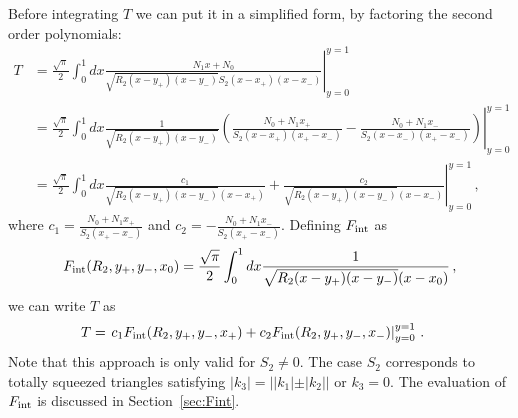 \documentclass[twoside]{article}
\begin{document}
Before integrating $T$ we can put it in a simplified form, by factoring the second order polynomials:
\begin{align}
  T &=  \frac{\sqrt{\pi}}{2}\int_0^1 dx \left. \frac{N_1 x + N_0}{\sqrt{R_2(x - y_+)(x - y_-)}S_2(x - x_+)(x - x_-)} \right|^{y = 1}_{y = 0}\\
&= \frac{\sqrt{\pi}}{2}\int_0^1 dx \left. \frac{1}{\sqrt{R_2(x - y_+)(x - y_-)}}\left(\frac{N_0+N_1 x_+}{S_2(x - x_+)(x_+ - x_-)} - \frac{N_0+N_1 x_-}{S_2(x - x_-)(x_+ - x_-)}\right) \right|^{y = 1}_{y = 0} \\
&= \frac{\sqrt{\pi}}{2}\int_0^1 dx \left. \frac{c_1}{\sqrt{R_2(x - y_+)(x - y_-)}(x-x_+)}+\frac{c_2}{\sqrt{R_2(x - y_+)(x - y_-)}(x-x_-)} \right|^{y = 1}_{y = 0} \,, 
\end{align}
where $c_1 = \frac{N_0+N_1 x_+}{S_2(x_+ - x_-)}$ and $c_2 = - \frac{N_0+N_1 x_-}{S_2(x_+ - x_-)}$. Defining $F_{\rm int}$ as 
\begin{equation}
F_{\rm int}(R_2, y_+, y_-, x_0) = \frac{\sqrt{\pi}}{2}\int_0^1 dx \frac{1}{\sqrt{R_2(x - y_+)(x - y_-)}(x-x_0)}\,,
\end{equation}
we can write $T$ as 
\begin{align}  
T &= \left.c_1 F_{\rm int}(R_2, y_+, y_-, x_+) + c_2 F_{\rm int}(R_2, y_+, y_-, x_-)\right|^{y = 1}_{y = 0}\,.
\end{align}
Note that this approach is only valid for $S_2 \neq 0$. The case $S_2$ corresponds to totally squeezed triangles satisfying $|k_3| = ||k_1| \pm |k_2||$ or $k_3 = 0$.
The evaluation of $F_{\rm int}$ is discussed in Section~\ref{sec:Fint}.
\end{document}
